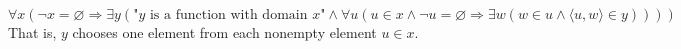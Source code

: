 $$\forall x (\neg x = \varnothing \Rightarrow \exists y (\text{"$y$ is a function with domain $x$"} \land \forall u (u \in x \land \neg u = \varnothing \Rightarrow \exists w (w \in u \land \langle u, w \rangle \in y))))$$
That is, $y$ chooses one element from each nonempty element $u \in x$.
